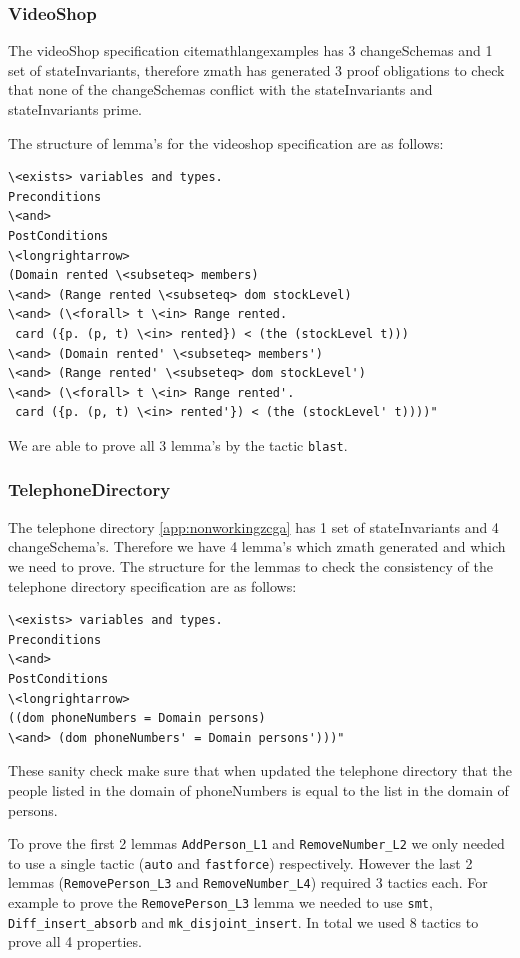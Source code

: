 \subsubsection{VideoShop}

The videoShop specification cite{mathlangexamples} has 3 changeSchemas and 1 set of stateInvariants,
therefore \gls{zmath} has generated 3 proof obligations to check that none of
the changeSchemas conflict with the stateInvariants and stateInvariants prime.

The structure of lemma's for the videoshop specification are as follows:

\begin{verbatim}
\<exists> variables and types.
Preconditions
\<and>
PostConditions
\<longrightarrow>
(Domain rented \<subseteq> members)
\<and> (Range rented \<subseteq> dom stockLevel)
\<and> (\<forall> t \<in> Range rented.
 card ({p. (p, t) \<in> rented}) < (the (stockLevel t)))
\<and> (Domain rented' \<subseteq> members')
\<and> (Range rented' \<subseteq> dom stockLevel')
\<and> (\<forall> t \<in> Range rented'.
 card ({p. (p, t) \<in> rented'}) < (the (stockLevel' t))))"
\end{verbatim}

We are able to prove all 3 lemma's by the tactic \verb|blast|. 

\subsubsection{TelephoneDirectory}

The telephone directory \ref{app:nonworkingzcga} has 1 set of stateInvariants and 4 changeSchema's.
Therefore we have 4 lemma's which \gls{zmath} generated and which we need to
prove. The structure for the lemmas to check the consistency of the telephone
directory specification are as follows:

\begin{verbatim}
\<exists> variables and types.
Preconditions
\<and>
PostConditions
\<longrightarrow>
((dom phoneNumbers = Domain persons)
\<and> (dom phoneNumbers' = Domain persons')))"
\end{verbatim}

These sanity check make sure that when updated the telephone directory that the
people listed in the domain of phoneNumbers is equal to the list in the domain
of persons.

To prove the first 2 lemmas \verb|AddPerson_L1| and \verb|RemoveNumber_L2| we
only needed to use a single tactic (\verb|auto| and \verb|fastforce|)
respectively. However the last 2 lemmas (\verb|RemovePerson_L3| and
\verb|RemoveNumber_L4|) required 3 tactics each. For example to prove the
\verb|RemovePerson_L3| lemma we needed to use \verb|smt|,
\verb|Diff_insert_absorb| and \verb|mk_disjoint_insert|. In total we used 8
tactics to prove all 4 properties.

